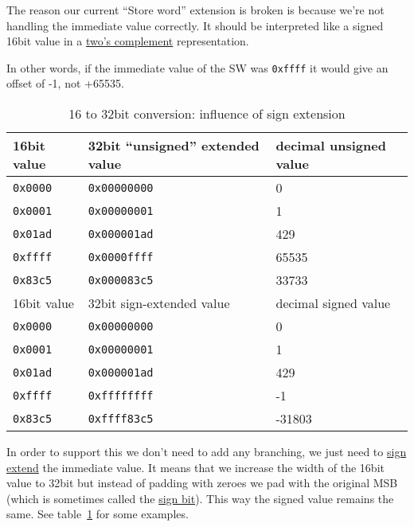 \documentclass[a4paper]{article}
\newcommand{\code}[1] {\texttt{#1}}
\begin{document}
The reason our current ``Store word'' extension is broken is because
we're not handling the immediate value correctly. It should be
interpreted like a signed 16bit value in a
\href{https://en.wikipedia.org/wiki/Two%27s_complement}{two's complement}
representation.

In other words, if the immediate value of the SW was \code{0xffff}
it would give an offset of -1, not +65535.

\begin{table}[ht]
  \centering

  \begin{tabular}{ l | l | l }
    16bit value & 32bit ``unsigned'' extended value & decimal unsigned value \\
    \hline
    \code{0x0000} & \code{0x00000000} & 0     \\
    \code{0x0001} & \code{0x00000001} & 1     \\
    \code{0x01ad} & \code{0x000001ad} & 429   \\
    \code{0xffff} & \code{0x0000ffff} & 65535 \\
    \code{0x83c5} & \code{0x000083c5} & 33733 \\
    \hline
    \hline
    16bit value & 32bit sign-extended value & decimal signed value \\
    \hline
    \code{0x0000} & \code{0x00000000} & 0      \\
    \code{0x0001} & \code{0x00000001} & 1      \\
    \code{0x01ad} & \code{0x000001ad} & 429    \\
    \code{0xffff} & \code{0xffffffff} & -1     \\
    \code{0x83c5} & \code{0xffff83c5} & -31803 \\
  \end{tabular}

  \caption{16 to 32bit conversion: influence of sign extension}
  \label{tab:signextend}
\end{table}

In order to support this we don't need to add any branching, we just
need to \href{https://en.wikipedia.org/wiki/Sign_extension}{sign
  extend} the immediate value. It means that we increase the width of
the 16bit value to 32bit but instead of padding with zeroes we pad
with the original MSB (which is sometimes called the
\href{https://en.wikipedia.org/wiki/Sign_bit}{sign bit}). This way the
signed value remains the same. See table~\ref{tab:signextend} for some
examples.
\end{document}
